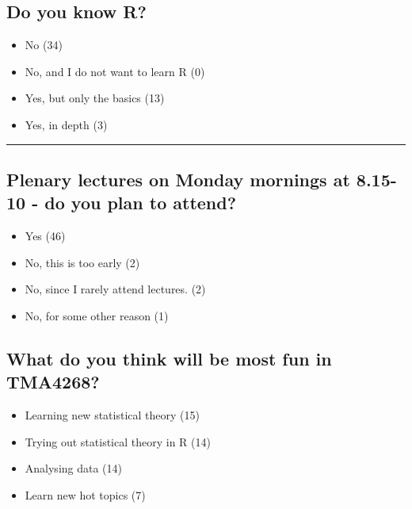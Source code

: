 \documentclass[]{article}
\providecommand{\tightlist}{%
  \setlength{\itemsep}{0pt}\setlength{\parskip}{0pt}}
\begin{document}
\hypertarget{do-you-know-r}{%
\subsection{Do you know R?}\label{do-you-know-r}}

\begin{itemize}
\tightlist
\item
  No (34)
\item
  No, and I do not want to learn R (0)
\item
  Yes, but only the basics (13)
\item
  Yes, in depth (3)
\end{itemize}

\begin{center}\rule{0.5\linewidth}{\linethickness}\end{center}

\hypertarget{plenary-lectures-on-monday-mornings-at-8.15-10---do-you-plan-to-attend}{%
\subsection{Plenary lectures on Monday mornings at 8.15-10 - do you plan
to
attend?}\label{plenary-lectures-on-monday-mornings-at-8.15-10---do-you-plan-to-attend}}

\begin{itemize}
\tightlist
\item
  Yes (46)
\item
  No, this is too early (2)
\item
  No, since I rarely attend lectures. (2)
\item
  No, for some other reason (1)
\end{itemize}

\hypertarget{what-do-you-think-will-be-most-fun-in-tma4268}{%
\subsection{What do you think will be most fun in
TMA4268?}\label{what-do-you-think-will-be-most-fun-in-tma4268}}

\begin{itemize}
\tightlist
\item
  Learning new statistical theory (15)
\item
  Trying out statistical theory in R (14)
\item
  Analysing data (14)
\item
  Learn new hot topics (7)
\end{itemize}
\end{document}
